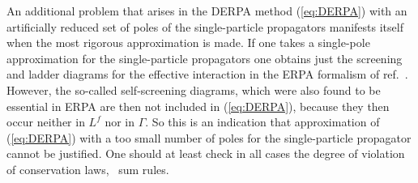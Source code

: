 An additional problem that arises in the DERPA method (\ref{eq:DERPA}) with 
an artificially reduced set of poles of the single-particle propagators 
manifests itself when the most rigorous approximation is made. 
If one takes a single-pole approximation for the single-particle propagators 
one obtains just the screening and ladder diagrams for the effective 
interaction in the ERPA formalism of ref.~\cite{BAD90}. However, the 
so-called self-screening diagrams, which were also found to be essential in 
ERPA are then not included in (\ref{eq:DERPA}), because they then occur 
neither in $L^f$ nor in $\Gamma$. So this is an indication that approximation 
of (\ref{eq:DERPA}) with a too small number of poles for the single-particle 
propagator cannot be justified. One should at least check in all cases the 
degree of violation of conservation laws, \ie\ sum rules.
